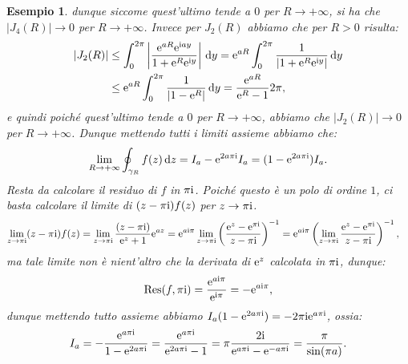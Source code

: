 \documentclass[11pt]{book}
\theoremstyle{Definizione}
\theoremstyle{TeoremaProposizioneLemmaCorollarioCongettura}
\theoremstyle{OsservazioneNotaEsempio}
\newtheorem{myes}{Esempio}[section]
\renewcommand{\i}{\textup{i}}
\newcommand{\e}{\textup{e}}
\renewcommand{\d}{\mathrm{d}}
\newcommand{\dz}{\,\d z}
\newcommand{\dy}{\,\d y}
\newcommand{\Res}{\textup{Res}}
\begin{document}
\begin{myes}
dunque siccome quest'ultimo tende a $0$ per $R \to +\infty$, si ha che $|J_4(R)| \to 0$ per $R \to +\infty$.
Invece per $J_2(R)$ abbiamo che per $R > 0$ risulta:
\begin{align*}
|J_2(R)| &\leq \int_{0}^{2\pi} \left|\frac{\e^{aR}\e^{\i ay}}{1+\e^{R}\e^{\i y}}\right|\dy = \e^{aR} \int_{0}^{2\pi} \frac{1}{|1+\e^{R}\e^{\i y}|}\dy\\
&\leq \e^{aR} \int_{0}^{2\pi} \frac{1}{|1-\e^{R}|}\dy = \frac{\e^{aR}}{\e^{R}-1}2\pi,
\end{align*}
e quindi poiché quest'ultimo tende a $0$ per $R \to +\infty$, abbiamo che $|J_2(R)| \to 0$ per $R \to +\infty$. Dunque mettendo tutti i limiti assieme abbiamo che:
$$
\lim_{R \to +\infty} \oint_{\gamma_R} f(z)\dz = I_a-\e^{2a\pi\i}I_a = (1-\e^{2a\pi\i})I_a.
$$
Resta da calcolare il residuo di $f$ in $\pi\i$. Poiché questo è un polo di ordine $1$, ci basta calcolare il limite di $(z-\pi\i)f(z)$ per $z \to \pi\i$.
\begin{align*}
\lim_{z \to \pi\i} (z-\pi\i)f(z) &= \lim_{z \to \pi\i} \frac{(z-\pi\i)}{\e^{z}+1}\e^{az} = \e^{a\i\pi} \lim_{z \to \pi\i} \left(\frac{\e^{z}-\e^{\pi\i}}{z-\pi\i}\right)^{-1}  = \e^{a\i\pi} \left(\lim_{z \to \pi\i} \frac{\e^{z}-\e^{\pi\i}}{z-\pi\i}\right)^{-1},
\end{align*}
ma tale limite non è nient'altro che la derivata di $\e^{z}$ calcolata in $\pi\i$, dunque:
$$
\Res(f,\pi\i) = \frac{\e^{a\i\pi}}{\e^{\i\pi}} = -\e^{a\i\pi},
$$
dunque mettendo tutto assieme abbiamo $I_a(1-\e^{2a\pi\i}) = -2\pi\i\e^{a\pi\i}$, ossia:
$$
I_a = -\frac{\e^{a\pi\i}}{1-\e^{2a\pi\i}} = \frac{\e^{a\pi\i}}{\e^{2a\pi\i}-1} = \pi\frac{2\i}{\e^{a\pi\i}-\e^{-a\pi\i}} = \frac{\pi}{\sin(\pi a)}.
$$
\end{myes}
\end{document}
